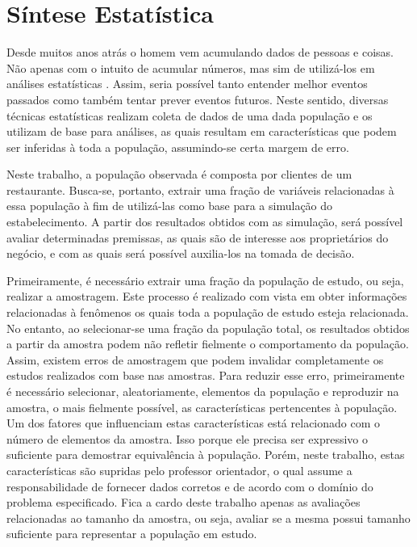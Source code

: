 \documentclass[pt,disc,oneside]{ufscpgeasthesis}
\begin{document}
		\section{Síntese Estatística}
		\label{sec:sintese}

			Desde muitos anos atrás o homem vem acumulando dados de pessoas e coisas.
			Não apenas com o intuito de acumular números, mas sim de utilizá-los em análises estatísticas \cite{Estatistica}.
			Assim, seria possível tanto entender melhor eventos passados como também tentar prever eventos futuros.
			Neste sentido, diversas técnicas estatísticas realizam coleta de dados de uma dada população e os utilizam de base para análises, as quais resultam em características que podem ser inferidas à toda a população, assumindo-se certa margem de erro.

			Neste trabalho, a população observada é composta por clientes de um restaurante.
			Busca-se, portanto, extrair uma fração de variáveis relacionadas à essa população à fim de utilizá-las como base para a simulação do estabelecimento.
			A partir dos resultados obtidos com as simulação, será possível avaliar determinadas premissas, as quais são de interesse aos proprietários do negócio, e com as quais será possível auxilia-los na tomada de decisão.

			Primeiramente, é necessário extrair uma fração da população de estudo, ou seja, realizar a amostragem.
			Este processo é realizado com vista em obter informações relacionadas à fenômenos os quais toda a população de estudo esteja relacionada.
			No entanto, ao selecionar-se uma fração da população total, os resultados obtidos a partir da amostra podem não refletir fielmente o comportamento da população.
			Assim, existem erros de amostragem que podem invalidar completamente os estudos realizados com base nas amostras.
			Para reduzir esse erro, primeiramente é necessário selecionar, aleatoriamente, elementos da população e reproduzir na amostra, o mais fielmente possível, as características pertencentes à população.
			Um dos fatores que influenciam estas características está relacionado com o número de elementos da amostra.
			Isso porque ele precisa ser expressivo o suficiente para demostrar equivalência à população.
			Porém, neste trabalho, estas características são supridas pelo professor orientador, o qual assume a responsabilidade de fornecer dados corretos e de acordo com o domínio do problema especificado.
			Fica a cardo deste trabalho apenas as avaliações relacionadas ao tamanho da amostra, ou seja, avaliar se a mesma possui tamanho suficiente para representar a população em estudo.
\end{document}
